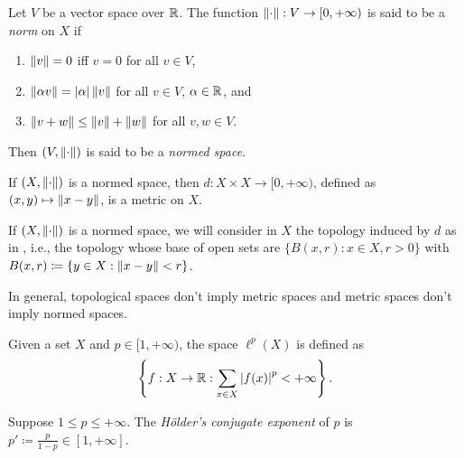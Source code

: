 \documentclass{techreport}
\begin{document}
\begin{definition}\label{De:Norms}
	Let $V$ be a vector space over $\mathbb{R}$.
	The function $\left\|{\cdot}\right\| : V \to [0,+\infty)$ is said to be a \emph{norm} on $X$ if
	\begin{enumerate}
		\item $\left\|{v}\right\| = 0$ iff $v = 0$ for all $v \in V$,
		\item $\left\|{\alpha v}\right\| = \left|{\alpha}\right| \left\|{v}\right\|$ for all $v \in V$, $\alpha \in \mathbb{R}$, and
		\item $\left\|{v+w}\right\| \le \left\|{v}\right\| + \left\|{w}\right\|$ for all $v,w \in V$.
	\end{enumerate}
	Then $(V,\left\|{\cdot}\right\|)$ is said to be a \emph{normed space}.
\end{definition}

\begin{proposition}\label{Prop:NormInduceMetric}
	If $(X,\left\|{\cdot}\right\|)$ is a normed space, then $d : X \times X \to [0,+\infty)$, defined as $(x,y) \mapsto \left\|{x-y}\right\|$, is a metric on $X$.
\end{proposition}

\begin{remark}\label{Rem:NormedBalls}
	If $(X,\left\|{\cdot}\right\|)$ is a normed space, we will consider in $X$ the topology induced by $d$ as in , i.e., the topology whose base of open sets are $\{ B(x,r) : x \in X, r > 0 \}$ with $B(x,r) \coloneqq \{ y \in X : \left\|{x-y}\right\| < r \}$.
\end{remark}

\begin{remark}\label{Rem:MetricNotImplyNorm}
	In general, topological spaces don't imply metric spaces and metric spaces don't imply normed spaces.
\end{remark}

\begin{definition}\label{De:lpSpaces}
	Given a set $X$ and $p \in [1,+\infty)$, the space $\ell^p(X)$ is defined as
	\begin{equation*}
		\left\{ { f : X \to \mathbb{R} : \sum_{x \in X} \left|{f(x)}\right|^p < +\infty } \right\}.
	\end{equation*}
\end{definition}

\begin{definition}\label{De:HoldersConjugateExponent}
	Suppose $1 \le p \le +\infty$.
	The \emph{H{\"o}lder's conjugate exponent} of $p$ is $p' \coloneqq \frac{p}{1-p} \in [1,+\infty]$.
\end{definition}
\end{document}
